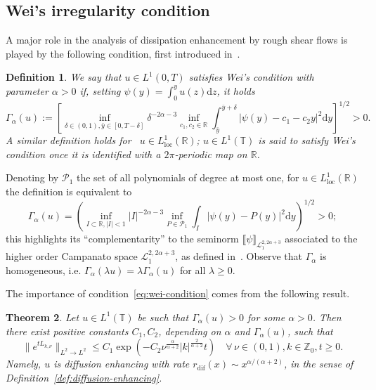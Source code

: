 \documentclass[11pt,oneside,reqno]{amsart}
\newcommand{\assign}{:=}
\newcommand{\mathd}{\mathrm{d}}
\newcommand{\tmop}[1]{\ensuremath{\operatorname{#1}}}
\newtheorem{theorem}{Theorem}[section]
\newtheorem{definition}[theorem]{Definition}
\numberwithin{equation}{section}
\begin{document}
\subsection{Wei's irregularity condition}\label{sec:wei-enhanced}

A major role in the analysis of dissipation enhancement by rough shear flows
is played by the following condition, first introduced in~{\cite{wei}}.

\begin{definition}
  \label{def:wei-condition}We say that $u \in L^1 (0, T)$ satisfies Wei's
  condition with parameter $\alpha > 0$ if, setting $\psi (y) = \int_0^y u (z)
  \mathd z$, it holds
  \begin{equation}
    \Gamma_{\alpha} (u) \assign \left[ \inf_{\delta \in (0, 1), \bar{y} \in
    [0, T - \delta]} \delta^{- 2 \alpha - 3} \inf_{c_1, c_2 \in \mathbb{R}}
    \int_{\bar{y}}^{\bar{y} + \delta} | \psi (y) - c_1 - c_2 y |^2 \mathd y
    \right]^{1 / 2} > 0. \label{eq:wei-condition}
  \end{equation}
  A similar definition holds for \ $u \in L^1_{\tmop{loc}} (\mathbb{R})$; $u
  \in L^1 (\mathbb{T})$ is said to satisfy Wei's condition once it is
  identified with a $2 \pi$-periodic map on $\mathbb{R}$.
\end{definition}

\begin{remark}
  Denoting by $\mathcal{P}_1$ the set of all polynomials of degree at most
  one, for $u \in L^1_{\tmop{loc}} (\mathbb{R})$ the definition is equivalent
  to
  \[ \Gamma_{\alpha} (u) = \left( \inf_{I \subset \mathbb{R}, | I | < 1} | I
     |^{- 2 \alpha - 3} \inf_{P \in \mathcal{P}_1} \int_I | \psi (y) - P (y)
     |^2 \mathd y \right)^{1 / 2} > 0 ; \]
  this highlights its ``complementarity'' to the seminorm $\llbracket \psi
  \rrbracket_{\mathcal{L}^{2, 2 \alpha + 3}_1}$ associated to the higher order
  Campanato space $\mathcal{L}_1^{2, 2 \alpha + 3}$, as defined
  in~{\cite{campanato1964}}. Observe that $\Gamma_{\alpha}$ is homogeneous,
  i.e. $\Gamma_{\alpha} (\lambda u) = \lambda \Gamma_{\alpha} (u)$ for all
  $\lambda \geqslant 0$.
\end{remark}

The importance of condition~\eqref{eq:wei-condition} comes from the following
result.

\begin{theorem}
  \label{thm:wei}Let $u \in L^1 (\mathbb{T})$ be such that $\Gamma_{\alpha}
  (u) > 0$ for some $\alpha > 0$. Then there exist positive constants $C_1,
  C_2$, depending on $\alpha$ and $\Gamma_{\alpha} (u)$, such that
  \begin{equation}
    \| e^{t L_{k, \nu}} \|_{L^2 \rightarrow L^2} \leqslant C_1 \exp \left( -
    C_2 \nu^{\frac{\alpha}{\alpha + 2}}  | k |^{\frac{2}{\alpha + 2}} t
    \right) \quad \forall \, \nu \in (0, 1), k \in \mathbb{Z}_0, t \geqslant
    0. \label{eq:wei-conclusion}
  \end{equation}
  Namely, $u$ is diffusion enhancing with rate $r_{\tmop{dif}}
  (x) \sim x^{\alpha / (\alpha + 2)}$, in the sense of
  Definition~\ref{def:diffusion-enhancing}.
\end{theorem}
\end{document}
